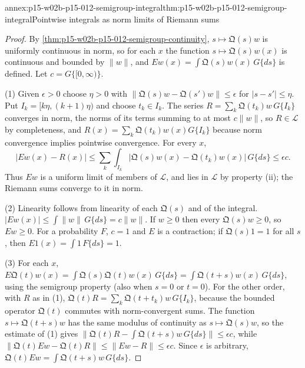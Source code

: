 \begin{annexitem}{annex:p15-w02b-p15-012-semigroup-integral}{thm:p15-w02b-p15-012-semigroup-integral}{Pointwise integrals as norm limits of Riemann sums}
\begin{proof}
By \cref{thm:p15-w02b-p15-012-semigroup-continuity}, \(s\mapsto\mathfrak Q(s)w\)
is uniformly continuous in norm, so for each \(x\) the function
\(s\mapsto\mathfrak Q(s)w(x)\) is continuous and bounded by \(\|w\|\), and
\(Ew(x)=\int\mathfrak Q(s)w(x)\,G\{ds\}\) is defined. Let \(c=G\{[0,\infty)\}\).

(1) Given \(\epsilon>0\) choose \(\eta>0\) with
\(\|\mathfrak Q(s)w-\mathfrak Q(s')w\|\leq\epsilon\) for \(|s-s'|\leq\eta\).
Put \(I_k=[k\eta,(k+1)\eta)\) and choose \(t_k\in I_k\). The series
\(R=\sum_k\mathfrak Q(t_k)w\,G\{I_k\}\) converges in norm, the norms of its
terms summing to at most \(c\|w\|\), so \(R\in\mathscr L\) by completeness,
and \(R(x)=\sum_k\mathfrak Q(t_k)w(x)G\{I_k\}\) because norm convergence
implies pointwise convergence. For every \(x\),
\[
 |Ew(x)-R(x)|\leq\sum_k\int_{I_k}|\mathfrak Q(s)w(x)-\mathfrak Q(t_k)w(x)|\,G\{ds\}\leq\epsilon c .
\]
Thus \(Ew\) is a uniform limit of members of \(\mathscr L\), and lies in
\(\mathscr L\) by property (ii); the Riemann sums converge to it in norm.

(2) Linearity follows from linearity of each \(\mathfrak Q(s)\) and of the
integral. \(|Ew(x)|\leq\int\|w\|\,G\{ds\}=c\|w\|\). If \(w\geq0\) then every
\(\mathfrak Q(s)w\geq0\), so \(Ew\geq0\). For a probability \(F\), \(c=1\) and
\(E\) is a contraction; if \(\mathfrak Q(s)1=1\) for all \(s\), then
\(E1(x)=\int1\,F\{ds\}=1\).

(3) For each \(x\),
\(E\mathfrak Q(t)w(x)=\int\mathfrak Q(s)\mathfrak Q(t)w(x)\,G\{ds\}=\int\mathfrak Q(t+s)w(x)\,G\{ds\}\),
using the semigroup property (also when \(s=0\) or \(t=0\)). For the other
order, with \(R\) as in (1),
\(\mathfrak Q(t)R=\sum_k\mathfrak Q(t+t_k)w\,G\{I_k\}\), because the bounded
operator \(\mathfrak Q(t)\) commutes with norm-convergent sums. The function
\(s\mapsto\mathfrak Q(t+s)w\) has the same modulus of continuity as
\(s\mapsto\mathfrak Q(s)w\), so the estimate of (1) gives
\(\|\mathfrak Q(t)R-\int\mathfrak Q(t+s)w\,G\{ds\}\|\leq\epsilon c\), while
\(\|\mathfrak Q(t)Ew-\mathfrak Q(t)R\|\leq\|Ew-R\|\leq\epsilon c\). Since
\(\epsilon\) is arbitrary, \(\mathfrak Q(t)Ew=\int\mathfrak Q(t+s)w\,G\{ds\}\).
\end{proof}
\end{annexitem}

